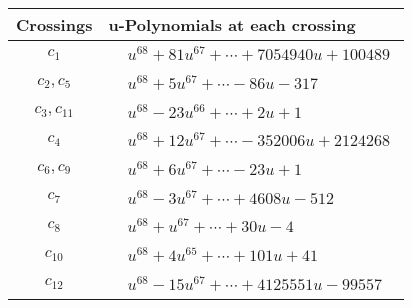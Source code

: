 \documentclass[1p]{elsarticle_modified}
\theoremstyle{definition}
\begin{document}
\begin{tabular}{m{50pt}|m{274pt}}
Crossings & \hspace{64pt}u-Polynomials at each crossing \\
\hline $$\begin{aligned}c_{1}\end{aligned}$$&$\begin{aligned}
&u^{68}+81 u^{67}+\cdots+7054940 u+100489
\end{aligned}$\\
\hline $$\begin{aligned}c_{2},c_{5}\end{aligned}$$&$\begin{aligned}
&u^{68}+5 u^{67}+\cdots-86 u-317
\end{aligned}$\\
\hline $$\begin{aligned}c_{3},c_{11}\end{aligned}$$&$\begin{aligned}
&u^{68}-23 u^{66}+\cdots+2 u+1
\end{aligned}$\\
\hline $$\begin{aligned}c_{4}\end{aligned}$$&$\begin{aligned}
&u^{68}+12 u^{67}+\cdots-352006 u+2124268
\end{aligned}$\\
\hline $$\begin{aligned}c_{6},c_{9}\end{aligned}$$&$\begin{aligned}
&u^{68}+6 u^{67}+\cdots-23 u+1
\end{aligned}$\\
\hline $$\begin{aligned}c_{7}\end{aligned}$$&$\begin{aligned}
&u^{68}-3 u^{67}+\cdots+4608 u-512
\end{aligned}$\\
\hline $$\begin{aligned}c_{8}\end{aligned}$$&$\begin{aligned}
&u^{68}+u^{67}+\cdots+30 u-4
\end{aligned}$\\
\hline $$\begin{aligned}c_{10}\end{aligned}$$&$\begin{aligned}
&u^{68}+4 u^{65}+\cdots+101 u+41
\end{aligned}$\\
\hline $$\begin{aligned}c_{12}\end{aligned}$$&$\begin{aligned}
&u^{68}-15 u^{67}+\cdots+4125551 u-99557
\end{aligned}$\\
\hline
\end{tabular}\\~\\
\end{document}
